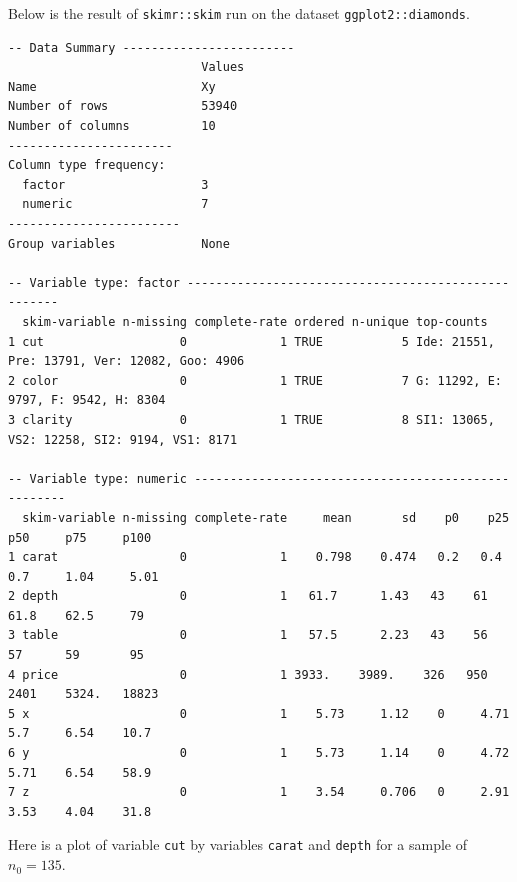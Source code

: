 \documentclass[12pt]{article}
\begin{document}
\eenum



\problem Below is the result of \texttt{skimr::skim} run on the dataset \texttt{ggplot2::diamonds}.


\begin{Verbatim}[frame=single,fontsize=\scriptsize]
-- Data Summary ------------------------
                           Values
Name                       Xy    
Number of rows             53940 
Number of columns          10    
-----------------------          
Column type frequency:           
  factor                   3     
  numeric                  7     
------------------------         
Group variables            None  

-- Variable type: factor ----------------------------------------------------
  skim-variable n-missing complete-rate ordered n-unique top-counts                                   
1 cut                   0             1 TRUE           5 Ide: 21551, Pre: 13791, Ver: 12082, Goo: 4906
2 color                 0             1 TRUE           7 G: 11292, E: 9797, F: 9542, H: 8304          
3 clarity               0             1 TRUE           8 SI1: 13065, VS2: 12258, SI2: 9194, VS1: 8171 

-- Variable type: numeric ----------------------------------------------------
  skim-variable n-missing complete-rate     mean       sd    p0    p25     p50     p75     p100 
1 carat                 0             1    0.798    0.474   0.2   0.4     0.7     1.04     5.01 
2 depth                 0             1   61.7      1.43   43    61      61.8    62.5     79    
3 table                 0             1   57.5      2.23   43    56      57      59       95   
4 price                 0             1 3933.    3989.    326   950    2401    5324.   18823   
5 x                     0             1    5.73     1.12    0     4.71    5.7     6.54    10.7  
6 y                     0             1    5.73     1.14    0     4.72    5.71    6.54    58.9  
7 z                     0             1    3.54     0.706   0     2.91    3.53    4.04    31.8  
\end{Verbatim}



Here is a plot of variable \texttt{cut} by variables \texttt{carat} and \texttt{depth} for a sample of $n_0 = 135$.
\end{document}

